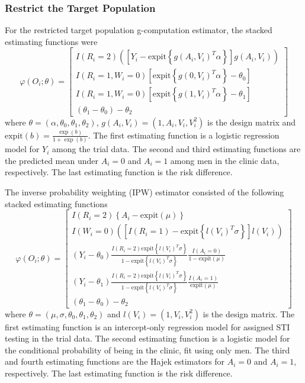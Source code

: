 \documentclass[]{article}
\begin{document}
\subsubsection*{Restrict the Target Population}

For the restricted target population g-computation estimator, the stacked estimating functions were
\[\varphi(O_i; \theta) = 
\begin{bmatrix}
	I(R_i = 2) \left(\left[ Y_i - \text{expit}\left\{g(A_i,V_i)^T \alpha \right\} \right] g(A_i, V_i)\right)\\
	I(R_i = 1, W_i = 0) \left[\text{expit}\left\{g(0,V_i)^T \alpha\right\} - \theta_0\right] \\
	I(R_i = 1, W_i = 0) \left[\text{expit}\left\{g(1,V_i)^T \alpha\right\} - \theta_1\right] \\
	(\theta_1 - \theta_0) - \theta_2
\end{bmatrix}\]
where $\theta = (\alpha, \theta_0, \theta_1, \theta_2)$, $g(A_i,V_i) = (1, A_i, V_i, V_i^2)$ is the design matrix and $\text{expit}(b) = \frac{\exp(b)}{1 + \exp(b)}$. The first estimating function is a logistic regression model for $Y_i$ among the trial data. The second and third estimating functions are the predicted mean under $A_i=0$ and $A_i=1$ among men in the clinic data, respectively. The last estimating function is the risk difference.

The inverse probability weighting (IPW) estimator consisted of the following stacked estimating functions
\[\varphi(O_i; \theta) = 
\begin{bmatrix}
	I(R_i=2) \left\{A_i - \text{expit}(\mu)\right\} \\
	I(W_i = 0) \left(\left[I(R_i = 1) - \text{expit}\left\{l(V_i)^T \sigma\right\}\right] l(V_i) \right) \\
	(Y_i - \theta_0) \frac{I(R_i = 2) \text{expit}\left\{l(V_i)^T \sigma \right\} }{1 - \text{expit}\left\{l(V_i)^T \sigma \right\}} \frac{I(A_i = 0)}{1 - \text{expit}(\mu)} \\
	(Y_i - \theta_1) \frac{I(R_i = 2) \text{expit}\left\{l(V_i)^T \sigma \right\} }{1 - \text{expit}\left\{l(V_i)^T \sigma \right\}} \frac{I(A_i = 1)}{\text{expit}(\mu)} \\
	(\theta_1 - \theta_0) - \theta_2
\end{bmatrix}\]
where $\theta = (\mu, \sigma, \theta_0, \theta_1, \theta_2)$ and $l(V_i) = (1, V_i, V_i^2)$ is the design matrix. The first estimating function is an intercept-only regression model for assigned STI testing in the trial data. The second estimating function is a logistic model for the conditional probability of being in the clinic, fit using only men. The third and fourth estimating functions are the Hajek estimators for $A_i=0$ and $A_i=1$, respectively. The last estimating function is the risk difference.
\end{document}
